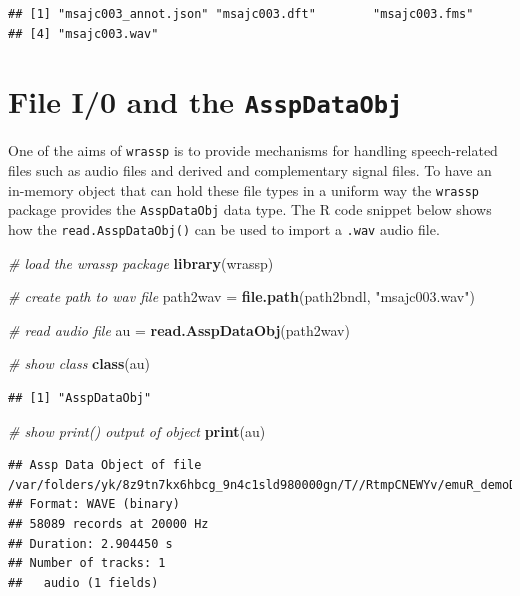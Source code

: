 \documentclass[]{book}
\newenvironment{Shaded}{\begin{snugshade}}{\end{snugshade}}
\newcommand{\CommentTok}[1]{\textcolor[rgb]{0.56,0.35,0.01}{\textit{#1}}}
\newcommand{\KeywordTok}[1]{\textcolor[rgb]{0.13,0.29,0.53}{\textbf{#1}}}
\newcommand{\NormalTok}[1]{#1}
\newcommand{\StringTok}[1]{\textcolor[rgb]{0.31,0.60,0.02}{#1}}
\begin{document}
\begin{verbatim}
## [1] "msajc003_annot.json" "msajc003.dft"        "msajc003.fms"       
## [4] "msajc003.wav"
\end{verbatim}

\hypertarget{file-i0-and-the-asspdataobj}{%
\section{\texorpdfstring{File I/0 and the \texttt{AsspDataObj}}{File I/0 and the AsspDataObj}}\label{file-i0-and-the-asspdataobj}}

One of the aims of \texttt{wrassp} is to provide mechanisms for handling speech-related files such as audio files and derived and complementary signal files. To have an in-memory object that can hold these file types in a uniform way the \texttt{wrassp} package provides the \texttt{AsspDataObj} data type. The R code snippet below shows how the \texttt{read.AsspDataObj()} can be used to import a \texttt{.wav} audio file.

\begin{Shaded}
\begin{Highlighting}[]
\CommentTok{# load the wrassp package}
\KeywordTok{library}\NormalTok{(wrassp)}

\CommentTok{# create path to wav file}
\NormalTok{path2wav =}\StringTok{ }\KeywordTok{file.path}\NormalTok{(path2bndl, }\StringTok{"msajc003.wav"}\NormalTok{)}

\CommentTok{# read audio file}
\NormalTok{au =}\StringTok{ }\KeywordTok{read.AsspDataObj}\NormalTok{(path2wav)}

\CommentTok{# show class}
\KeywordTok{class}\NormalTok{(au)}
\end{Highlighting}
\end{Shaded}

\begin{verbatim}
## [1] "AsspDataObj"
\end{verbatim}

\begin{Shaded}
\begin{Highlighting}[]
\CommentTok{# show print() output of object}
\KeywordTok{print}\NormalTok{(au)}
\end{Highlighting}
\end{Shaded}

\begin{verbatim}
## Assp Data Object of file /var/folders/yk/8z9tn7kx6hbcg_9n4c1sld980000gn/T//RtmpCNEWYv/emuR_demoData/ae_emuDB/0000_ses/msajc003_bndl/msajc003.wav.
## Format: WAVE (binary)
## 58089 records at 20000 Hz
## Duration: 2.904450 s
## Number of tracks: 1 
##   audio (1 fields)
\end{verbatim}
\end{document}
